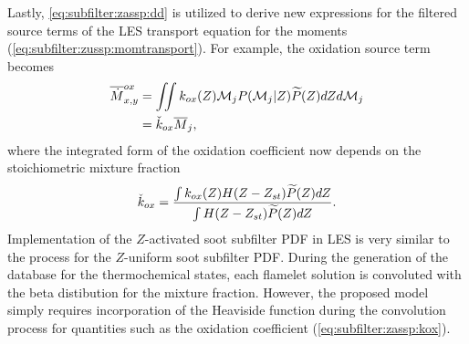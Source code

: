 Lastly, \cref{eq:subfilter:zassp:dd} is utilized to derive new expressions for the filtered source terms of the LES transport equation for the moments (\cref{eq:subfilter:zussp:momtransport}). For example, the oxidation source term becomes
\begin{equation}\label{eq:subfilter:zassp:ox}
  \begin{split}
    \fst[M]{x,y}^{ox} &= \iint k_{ox}(Z)\mc{M}_j P(\mc{M}_j|Z)\pz dZ d\mc{M}_j \\
    &= \check{k}_{ox}\mean{M}_j,
  \end{split}
\end{equation}
where the integrated form of the oxidation coefficient now depends on the stoichiometric mixture fraction
\begin{equation}\label{eq:subfilter:zassp:kox}
  \check{k}_{ox} = \frac{\int k_{ox}(Z)H(Z - Z_{st})\pz dZ}{\int H(Z - Z_{st})\pz dZ}.
\end{equation}
Implementation of the $Z$-activated soot subfilter PDF in LES is very similar to the process for the $Z$-uniform soot subfilter PDF. During the generation of the database for the thermochemical states, each flamelet solution is convoluted with the beta distibution for the mixture fraction. However, the proposed model simply requires incorporation of the Heaviside function during the convolution process for quantities such as the oxidation coefficient (\cref{eq:subfilter:zassp:kox}). 

